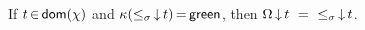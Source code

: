 \begin{lemma}[Chain]\label{lemma:complete-green}%
If $t\,{\in}\,\mathsf{dom}(\chi)$ and $\kappa({\mathrel{\leq_\sigma}}\,{\downarrow}\,t)\,{=}\,\mathsf{green}$, 
then
$\ideal{\stableorder}{t}\ =\ \ideal{{\tleq}}{t}$.
\end{lemma}


